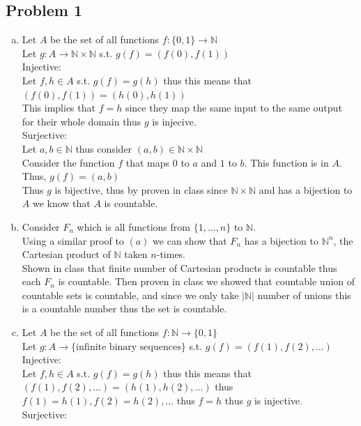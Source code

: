 \documentclass[12pt, letterpaper]{article}
\theoremstyle{definition}
\newcommand{\N}{\mathbb{N}}
\begin{document}
\pagestyle{fancy}
\fancyhf{}
\fancyhead[ROE]{\thepage}

\subsection*{Problem 1}
\begin{enumerate}[(a)]
    \item Let $A$ be the set of all functions $f: \{0,1\} \to \N$\\
    Let $g: A \to \N \times \N$ s.t. $g(f)=(f(0),f(1))$\\
    Injective:\\
    Let $f,h \in A$ s.t. $g(f)=g(h)$ thus this means that $(f(0),f(1))=(h(0),h(1))$\\
    This implies that $f=h$ since they map the same input to the same output for their whole domain thus $g$ is injecive.\\
    Surjective:\\
    Let $a,b \in \N$ thus consider $(a,b) \in \N \times \N$\\
    Consider the function $f$ that maps $0$ to $a$ and $1$ to $b$. This function is in $A$. Thus, $g(f)=(a,b)$\\
    Thus $g$ is bijective, thus by proven in class since $\N \times \N$ and has a bijection to $A$ we know that $A$ is countable.
    \item Consider $F_n$ which is all functions from $\{1,\dots,n\}$ to $\N$.\\
    Using a similar proof to $(a)$ we can show that $F_n$ has a bijection to $\N^n$, the Cartesian product of $\N$ taken $n$-times.\\
    Shown in class that finite number of Cartesian products is countable thus each $F_n$ is countable. Then proven in class we showed that countable union of countable sets is countable,
    and since we only take $|\N|$ number of unions this is a countable number thus the set is countable.
    \item Let $A$ be the set of all functions $f: \N \to \{0,1\}$\\
    Let $g: A \to \{\text{infinite binary sequences}\}$ s.t. $g(f)=(f(1),f(2),\dots)$\\
    Injective:\\
    Let $f,h \in A$ s.t. $g(f)=g(h)$ thus this means that $(f(1),f(2),\dots)=(h(1),h(2),\dots)$ thus $f(1)=h(1),f(2)=h(2),\dots$ thus $f=h$ thus $g$ is injective.\\
    Surjective:\\

\end{enumerate}
\end{document}
